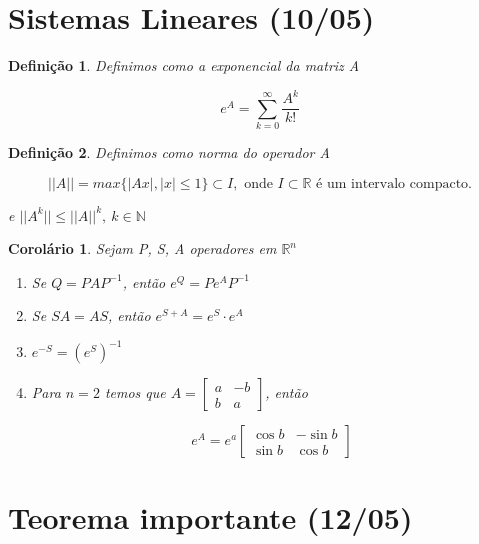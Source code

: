 \documentclass[12pt]{article}
\newtheorem{corollary}{Corolário}[theorem]
\newtheorem{definition}{Definição}
\begin{document}
\section{Sistemas Lineares (10/05)}
\begin{definition}
    Definimos como a exponencial da matriz A
    
    $$e^A = \sum_{k = 0}^\infty \frac{A^k}{k!}$$
\end{definition}

\begin{definition}
    Definimos como norma do operador A
    
    $$||A|| = max \{ |Ax|, |x| \leq 1 \} \subset I, \text{ onde } I \subset \mathbb{R} \text{ é um intervalo compacto.}$$
    
    e $||A^k|| \leq ||A||^k, \ k \in \mathbb{N}$ 
\end{definition}

\begin{corollary}
    Sejam P, S, A operadores em $\mathbb{R}^n$
    
    \begin{enumerate}
        \item Se $Q = P A P^{-1}$, então $e^Q = P e^A P^{-1}$
        
        \item Se $S A = A S$, então $e^{S + A} = e^S \cdot    e^A$
        
        \item $e^{-S} = (e^S)^{-1}$
        
        \item Para $n = 2$ temos que $ A = \left [ \begin{array}{cc}
             a & -b \\
             b & a
        \end{array} \right ]$, então
        
        $$e^A = e^a \left [ \begin{array}{cc}
             \cos{b} & -\sin{b} \\
             \sin{b} & \cos{b}
        \end{array} \right ]$$
    \end{enumerate}
\end{corollary}

\section{Teorema importante (12/05)}
\end{document}
